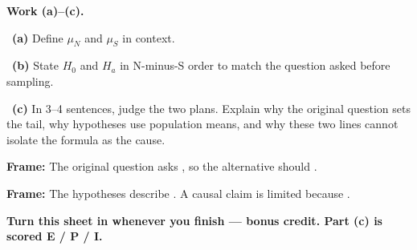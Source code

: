 \documentclass[11pt]{article}
\begin{document}
\newpage
\textbf{Work (a)--(c).}\par\smallskip

~\textbf{(a)} Define $\mu_N$ and $\mu_S$ in context.\par
\workspace{0.7in}

~\textbf{(b)} State $H_0$ and $H_a$ in N-minus-S order to match the question asked before sampling.\par
\workspace{1.4in}

~\textbf{(c)} In 3--4 sentences, judge the two plans. Explain why the original question sets the tail, why hypotheses use population means, and why these two lines cannot isolate the formula as the cause.\par
\workspace{2.0in}

\begin{sentenceframebox}\raggedright\textbf{Frame:} The original question asks \blank[1.8in], so the alternative should \blank[1.8in].\end{sentenceframebox}

\begin{sentenceframebox}\raggedright\textbf{Frame:} The hypotheses describe \blank[1.8in]. A causal claim is limited because \blank[2.0in].\end{sentenceframebox}

\textbf{Turn this sheet in whenever you finish --- bonus credit. Part (c) is scored E / P / I.}\par
\end{document}
